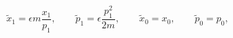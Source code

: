 \begin{equation}
\tilde x_1=\epsilon m\frac{x_1}{p_1}, \qquad
\tilde p_1=\epsilon \frac{p_1^2}{2m},\qquad
\tilde x_0=x_0,\qquad
\tilde p_0=p_0,
\label{canon}
\end{equation}

